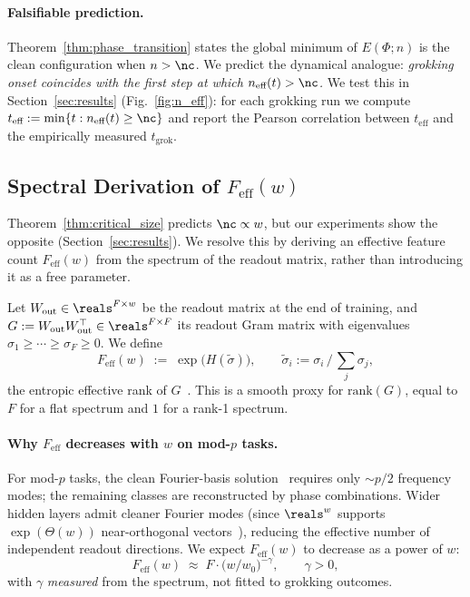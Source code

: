 \paragraph{Falsifiable prediction.}
Theorem~\ref{thm:phase_transition} states the global minimum of $E(\Phi;n)$ is the clean configuration when $n > \nc$.
We predict the dynamical analogue: \emph{grokking onset coincides with the first step at which $n_{\text{eff}}(t) > \nc$.}
We test this in Section~\ref{sec:results} (Fig.~\ref{fig:n_eff}): for each grokking run we compute $t_{\text{eff}} := \min\{t : n_{\text{eff}}(t) \geq \nc\}$ and report the Pearson correlation between $t_{\text{eff}}$ and the empirically measured $t_{\text{grok}}$.

\subsection{Spectral Derivation of $F_{\text{eff}}(w)$}
\label{sec:f_eff_spectral}

Theorem~\ref{thm:critical_size} predicts $\nc \propto w$, but our experiments show the opposite (Section~\ref{sec:results}).
We resolve this by deriving an effective feature count $F_{\text{eff}}(w)$ from the spectrum of the readout matrix, rather than introducing it as a free parameter.

Let $W_{\text{out}} \in \reals^{F\times w}$ be the readout matrix at the end of training, and $G := W_{\text{out}} W_{\text{out}}^\top \in \reals^{F\times F}$ its readout Gram matrix with eigenvalues $\sigma_1 \geq \cdots \geq \sigma_F \geq 0$. We define
\begin{equation}
\label{eq:f_eff_spectral}
F_{\text{eff}}(w) \;:=\; \exp\Big( H(\tilde\sigma) \Big), \qquad \tilde\sigma_i := \sigma_i \,/\, \textstyle\sum_j \sigma_j,
\end{equation}
the entropic effective rank of $G$~\citep{roy2007effective}. This is a smooth proxy for $\mathrm{rank}(G)$, equal to $F$ for a flat spectrum and $1$ for a rank-1 spectrum.

\paragraph{Why $F_{\text{eff}}$ decreases with $w$ on mod-$p$ tasks.}
For mod-$p$ tasks, the clean Fourier-basis solution~\citep{nanda2023progress} requires only $\sim p/2$ frequency modes; the remaining classes are reconstructed by phase combinations.
Wider hidden layers admit cleaner Fourier modes (since $\reals^w$ supports $\exp(\Theta(w))$ near-orthogonal vectors~\citep{milman1986asymptotic}), reducing the effective number of independent readout directions.
We expect $F_{\text{eff}}(w)$ to decrease as a power of $w$:
\begin{equation}
\label{eq:f_eff_power}
F_{\text{eff}}(w) \;\approx\; F \cdot \big(w/w_0\big)^{-\gamma}, \qquad \gamma > 0,
\end{equation}
with $\gamma$ \emph{measured} from the spectrum, not fitted to grokking outcomes.


